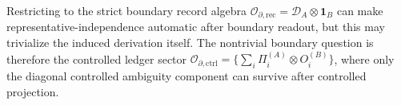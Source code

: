 \begin{remark}
Restricting to the strict boundary record algebra \(\mathcal O_{\partial,\mathrm{rec}}=\mathcal D_A\otimes \mathbf 1_B\) can make representative-independence automatic after boundary readout, but this may trivialize the induced derivation itself. The nontrivial boundary question is therefore the controlled ledger sector \(\mathcal O_{\partial,\mathrm{ctrl}}=\{\sum_i \Pi_i^{(A)}\otimes O_i^{(B)}\}\), where only the diagonal controlled ambiguity component can survive after controlled projection.
\end{remark}